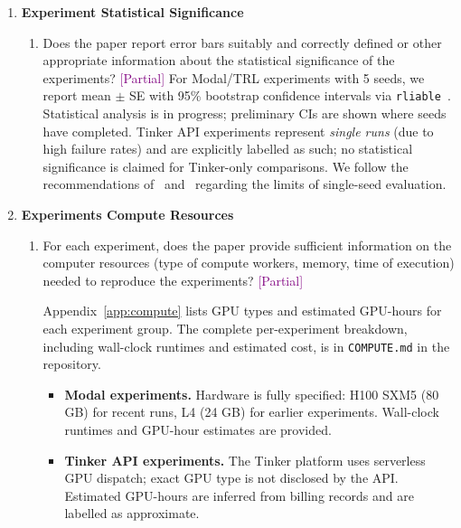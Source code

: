 \documentclass{article}
\newcommand{\answerPartial}[1][]{\textcolor{purple}{[Partial] #1}}
\begin{document}
\begin{enumerate}
\item {\bf Experiment Statistical Significance}
    \begin{enumerate}
        \item Does the paper report error bars suitably and correctly
              defined or other appropriate information about the statistical
              significance of the experiments?
        \answerPartial{For Modal/TRL experiments with 5 seeds, we report
        mean $\pm$ SE with 95\% bootstrap confidence intervals via
        \texttt{rliable}~\cite{agarwal2021deep}.  Statistical analysis is
        in progress; preliminary CIs are shown where seeds have completed.
        Tinker API experiments represent \emph{single runs} (due to high
        failure rates) and are explicitly labelled as such; no statistical
        significance is claimed for Tinker-only comparisons.  We follow the
        recommendations of~\citet{colas2019hitchhiker}
        and~\citet{jordan2024benchmarking} regarding the limits of
        single-seed evaluation.}
    \end{enumerate}

\item {\bf Experiments Compute Resources}
    \begin{enumerate}
        \item For each experiment, does the paper provide sufficient
              information on the computer resources (type of compute
              workers, memory, time of execution) needed to reproduce the
              experiments?
        \answerPartial{Appendix~\ref{app:compute} lists GPU types and
        estimated GPU-hours for each experiment group.  The complete
        per-experiment breakdown, including wall-clock runtimes and
        estimated cost, is in \texttt{COMPUTE.md} in the repository.
        \begin{itemize}
          \item \textbf{Modal experiments.}  Hardware is fully specified:
                H100 SXM5 (80 GB) for recent runs, L4 (24 GB) for earlier
                experiments.  Wall-clock runtimes and GPU-hour estimates are
                provided.
          \item \textbf{Tinker API experiments.}  The Tinker platform uses
                serverless GPU dispatch; exact GPU type is not disclosed by
                the API.  Estimated GPU-hours are inferred from billing
                records and are labelled as approximate.
        \end{itemize}}
    \end{enumerate}


\end{enumerate}
\end{document}

